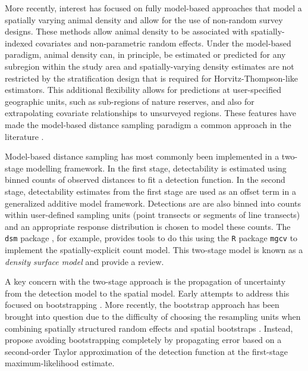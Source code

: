 \documentclass{statsoc}
\begin{document}
More recently, interest has focused on fully model-based approaches that model a spatially varying animal density and allow for the use of non-random survey designs.  These methods allow animal density to be associated with spatially-indexed covariates and non-parametric random effects.  Under the model-based paradigm, animal density can, in principle, be estimated or predicted for any subregion within the study area \citep{buckland_model-based_2016, miller_spatial_2013, johnson_model-based_2010} and spatially-varying density estimates are not restricted by the stratification design that is required for Horvitz-Thompson-like estimators.  This additional flexibility allows for predictions at user-specified geographic units, such as sub-regions of nature reserves, and also for extrapolating covariate relationships to unsurveyed regions.  These features have made the model-based distance sampling paradigm a common approach in the literature \citep{garciabaron_modelling_2019, herr_aerial_2019, breen_new_2017, williams_chilean_2011, stokes_monitoring_2010, williams_modeling_2006}.

Model-based distance sampling has most commonly been implemented in a two-stage modelling framework.  In the first stage, detectability is estimated using binned counts of observed distances to fit a detection function.  In the second stage, detectability estimates from the first stage are used as an offset term in a generalized additive model framework.  Detections are are also binned into counts within user-defined sampling units (point transects or segments of line transects) and an appropriate response distribution is chosen to model these counts.  The \texttt{dsm} package \citep{miller_spatial_2013}, for example, provides tools to do this using the \texttt{R} package \texttt{mgcv} \citep{wood_gam_2017} to implement the spatially-explicit count model.  This two-stage model is known as a \textit{density surface model} and \cite{miller_spatial_2013} provide a review.

A key concern with the two-stage approach is the propagation of uncertainty from the detection model to the spatial model.  Early attempts to address this focused on bootstrapping \citep{hedley_spatial_2004, lahiri_resampling_2003}.  More recently, the bootstrap approach has been brought into question due to the difficulty of choosing the resampling units when combining spatially structured random effects and spatial bootstraps \citep{bravington_VariancePropagationDensity_2021, williams_chilean_2011}. Instead, \cite{bravington_VariancePropagationDensity_2021} propose avoiding bootstrapping completely by propagating error based on a second-order Taylor approximation of the detection function at the first-stage maximum-likelihood estimate.
\end{document}

